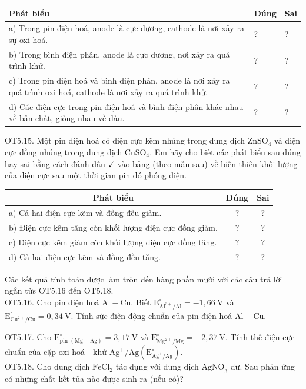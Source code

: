 \documentclass[10pt]{article}
\begin{document}
\begin{center}
\begin{tabular}{|l|l|l|}
\hline
Phát biểu & Đúng & Sai \\
\hline
a) Trong pin điện hoá, anode là cực dương, cathode là nơi xảy ra sự oxi hoá. & ? & ? \\
\hline
b) Trong bình điện phân, anode là cực dương, nơi xảy ra quá trình khử. & ? & ? \\
\hline
c) Trong pin điện hoá và bình điện phân, anode là nơi xảy ra quá trình oxi hoá, cathode là nơi xảy ra quá trình khử. & ? & ? \\
\hline
d) Các điện cực trong pin điện hoá và bình điện phân khác nhau về bản chất, giống nhau về dấu. & ? & ? \\
\hline
\end{tabular}
\end{center}

OT5.15. Một pin điện hoá có điện cực kẽm nhúng trong dung dịch $\mathrm{ZnSO}_{4}$ và điện cực đồng nhúng trong dung dịch $\mathrm{CuSO}_{4}$. Em hãy cho biết các phát biểu sau đúng hay sai bằng cách đánh dấu $\checkmark$ vào bảng (theo mẫu sau) về biến thiên khối lượng của điện cực sau một thời gian pin đó phóng điện.

\begin{center}
\begin{tabular}{|l|c|c|}
\hline
\multicolumn{1}{|c|}{Phát biểu} & Đúng & Sai \\
\hline
a) Cả hai điện cực kẽm và đồng đều giảm. & $?$ & $?$ \\
\hline
b) Điện cực kêm tăng còn khối lượng điện cực đồng giảm. & $?$ & $?$ \\
\hline
c) Điện cực kẽm giảm còn khối lượng điện cực đồng tăng. & $?$ & $?$ \\
\hline
d) Cả hai điện cực kẽm và đồng đều tăng. & $?$ & $?$ \\
\hline
\end{tabular}
\end{center}

Các kết quả tính toán được làm tròn đến hàng phần mười với các câu trả lời ngắn từs OT5.16 đến OT5.18.\\
OT5.16. Cho pin điện hoá $\mathrm{Al}-\mathrm{Cu}$. Biết $\mathrm{E}_{\mathrm{Al}^{3+} / \mathrm{Al}}^{\circ}=-1,66 \mathrm{~V}$ và $\mathrm{E}_{\mathrm{Cu}^{2+} / \mathrm{Cu}}^{\circ}=0,34 \mathrm{~V}$. Tính sức điện động chuẩn của pin điện hoá $\mathrm{Al}-\mathrm{Cu}$.

OT5.17. Cho $\mathrm{E}_{\text {pin }(\mathrm{Mg}-\mathrm{Ag})}^{\circ}=3,17 \mathrm{~V}$ và $\mathrm{E}_{\mathrm{Mg}^{2+} / \mathrm{Mg}}^{\circ}=-2,37 \mathrm{~V}$. Tính thế điện cực chuẩn của cặp oxi hoá - khử $\mathrm{Ag}^{+} / \mathrm{Ag}\left(\mathrm{E}_{\mathrm{Ag}^{+} / \mathrm{Ag}}^{\circ}\right)$.\\
OT5.18. Cho dung dịch $\mathrm{FeCl}_{2}$ tác dụng với dung dịch $\mathrm{AgNO}_{3}$ dư. Sau phản ứng có những chất kết tủa nào được sinh ra (nếu có)?
\end{document}
